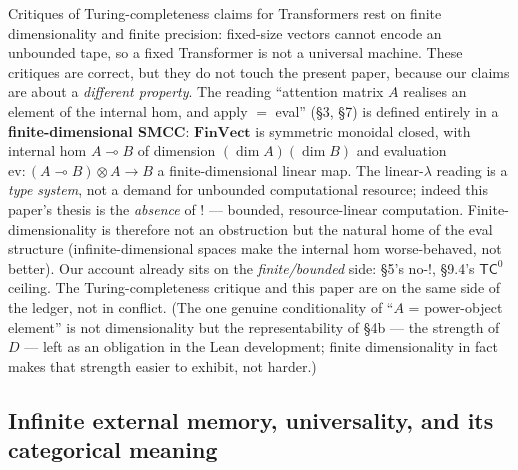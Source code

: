 \documentclass[a4paper,11pt]{article}
\begin{document}
Critiques of Turing-completeness claims for Transformers rest on finite
dimensionality and finite precision: fixed-size vectors cannot encode an
unbounded tape, so a fixed Transformer is not a universal machine. These
critiques are correct, but they do not touch the present paper, because
our claims are about a \emph{different property}. The reading
``attention matrix \(A\) realises an element of the internal hom, and
apply \(=\) eval'' (§3, §7) is defined entirely in a
\textbf{finite-dimensional SMCC}: \(\mathbf{FinVect}\) is symmetric
monoidal closed, with internal hom \(A\multimap B\) of dimension
\((\dim A)(\dim B)\) and evaluation
\(\mathrm{ev}:(A\multimap B)\otimes A\to B\) a finite-dimensional linear
map. The linear-\(\lambda\) reading is a \emph{type system}, not a
demand for unbounded computational resource; indeed this paper's thesis
is the \emph{absence} of \(!\) --- bounded, resource-linear computation.
Finite-dimensionality is therefore not an obstruction but the natural
home of the eval structure (infinite-dimensional spaces make the
internal hom worse-behaved, not better). Our account already sits on the
\emph{finite/bounded} side: §5's no-\(!\), §9.4's \(\mathsf{TC}^0\)
ceiling. The Turing-completeness critique and this paper are on the same
side of the ledger, not in conflict. (The one genuine conditionality of
``\(A\) = power-object element'' is not dimensionality but the
representability of §4b --- the strength of \(D\) --- left as an
obligation in the Lean development; finite dimensionality in fact makes
that strength easier to exhibit, not harder.)

\hypertarget{infinite-external-memory-universality-and-its-categorical-meaning}{%
\subsection{Infinite external memory, universality, and its categorical meaning}\label{infinite-external-memory-universality-and-its-categorical-meaning}}
\end{document}
